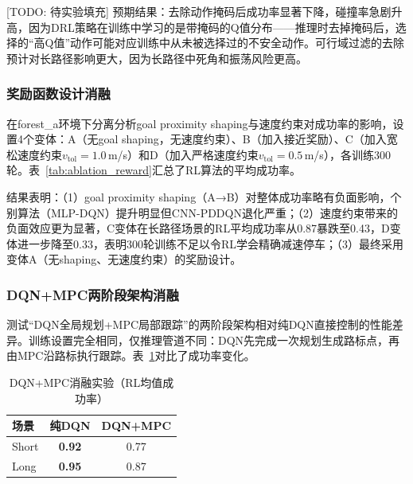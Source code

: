 \documentclass[twocolumn]{elsarticle}
\begin{document}
[TODO: 待实验填充] 预期结果：去除动作掩码后成功率显著下降，碰撞率急剧升高，因为DRL策略在训练中学习的是带掩码的Q值分布——推理时去掉掩码后，选择的``高Q值''动作可能对应训练中从未被选择过的不安全动作。可行域过滤的去除预计对长路径影响更大，因为长路径中死角和振荡风险更高。

\subsubsection{奖励函数设计消融}

在forest\_a环境下分离分析goal proximity shaping与速度约束对成功率的影响，设置4个变体：A（无goal shaping，无速度约束）、B（加入接近奖励）、C（加入宽松速度约束$v_{\text{tol}}=1.0$\,m/s）和D（加入严格速度约束$v_{\text{tol}}=0.5$\,m/s），各训练300轮。表~\ref{tab:ablation_reward}汇总了RL算法的平均成功率。

\begin{table}[t]
\centering
\caption{奖励函数消融实验（6种RL算法平均成功率）}
\label{tab:ablation_reward}
%
\end{table}

结果表明：（1）goal proximity shaping（A→B）对整体成功率略有负面影响，个别算法（MLP-DQN）提升明显但CNN-PDDQN退化严重；（2）速度约束带来的负面效应更为显著，C变体在长路径场景的RL平均成功率从0.87暴跌至0.43，D变体进一步降至0.33，表明300轮训练不足以令RL学会精确减速停车；（3）最终采用变体A（无shaping、无速度约束）的奖励设计。

\subsubsection{DQN+MPC两阶段架构消融}

测试``DQN全局规划+MPC局部跟踪''的两阶段架构相对纯DQN直接控制的性能差异。训练设置完全相同，仅推理管道不同：DQN先完成一次规划生成路标点，再由MPC沿路标执行跟踪。表~\ref{tab:ablation_mpc}对比了成功率变化。

\begin{table}[t]
\centering
\caption{DQN+MPC消融实验（RL均值成功率）}
\label{tab:ablation_mpc}
\footnotesize
\begin{tabular}{@{}lcc@{}}
\toprule
\textbf{场景} & \textbf{纯DQN} & \textbf{DQN+MPC} \\
\midrule
Short & \textbf{0.92} & 0.77 \\
Long  & \textbf{0.95} & 0.87 \\
\bottomrule
\end{tabular}
\end{table}
\end{document}

